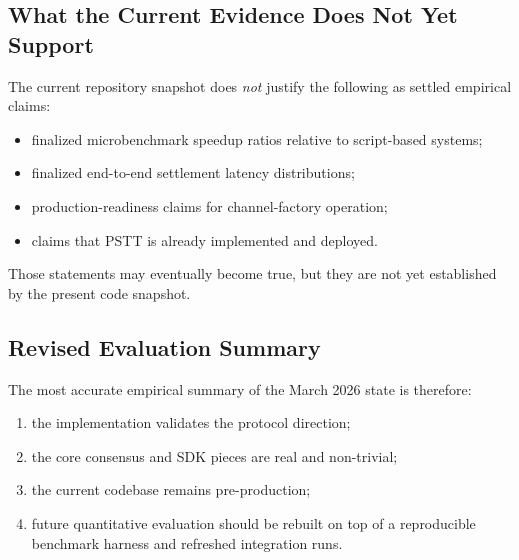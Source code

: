 \subsection{What the Current Evidence Does Not Yet Support}

The current repository snapshot does \textit{not} justify the following as settled empirical claims:
\begin{itemize}
    \item finalized microbenchmark speedup ratios relative to script-based systems;
    \item finalized end-to-end settlement latency distributions;
    \item production-readiness claims for channel-factory operation;
    \item claims that PSTT is already implemented and deployed.
\end{itemize}

Those statements may eventually become true, but they are not yet established by the present code snapshot.

\subsection{Revised Evaluation Summary}

The most accurate empirical summary of the March 2026 state is therefore:
\begin{enumerate}
    \item the implementation validates the protocol direction;
    \item the core consensus and SDK pieces are real and non-trivial;
    \item the current codebase remains pre-production;
    \item future quantitative evaluation should be rebuilt on top of a reproducible benchmark harness and refreshed integration runs.
\end{enumerate}
